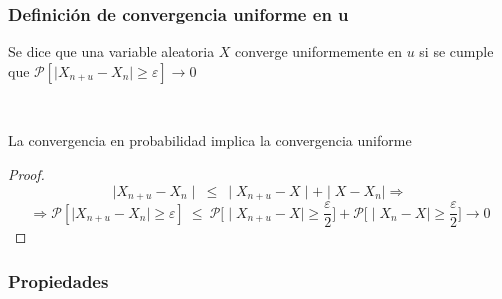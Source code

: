 \subsubsection{Definición de convergencia uniforme en u}

Se dice que una variable aleatoria $X$ converge uniformemente en $u$ si se cumple que $\mathcal{P}[\mid X_{n+u} - X_n \mid \geq \varepsilon] \to 0$

\begin{lemma}
\

La convergencia en probabilidad implica la convergencia uniforme
\end{lemma}

\begin{proof}
$$ \mid X_{n+u} - X_n \mid \ \leq \ \mid X_{n+u} - X \mid + \mid X - X_n \mid \Rightarrow$$
$$ \Rightarrow \mathcal{P}[\mid X_{n+u} - X_n \mid \geq \varepsilon] \ \leq \ \mathcal{P}\Big[\mid X_{n+u} - X \mid \geq \frac{\varepsilon}{2}\Big] + \mathcal{P}\Big[\mid X_{n} - X \mid \geq \frac{\varepsilon}{2}\Big] \to 0$$


\end{proof}

\subsubsection{Propiedades}

